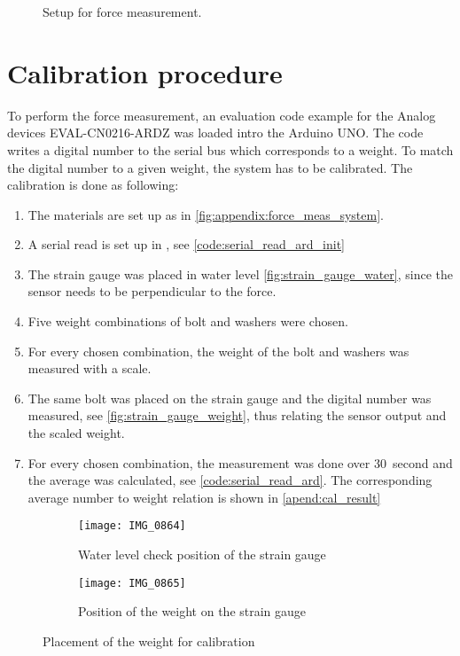 \begin{figure}[H]
\centering
\def\svgwidth{\columnwidth}

%
\caption{Setup for force measurement.}
		\label{fig:appendix:force_meas_system}
\end{figure}

\section*{Calibration procedure}
To perform the force measurement, an evaluation code example for the Analog devices EVAL-CN0216-ARDZ was loaded intro the Arduino UNO. The code writes a digital number to the serial bus which corresponds to a weight. To match the digital number to a given weight, the system has to be calibrated. The calibration is done as following: 

\begin{enumerate}
\item The materials are set up as in \autoref{fig:appendix:force_meas_system}.
\item A serial read is set up in \matlab, see \autoref{code:serial_read_ard_init}
\item The strain gauge was placed in water level \autoref{fig:strain_gauge_water}, since the sensor needs to be perpendicular to the force.
\item  Five weight combinations of bolt and washers were chosen.
\item  For every chosen combination, the weight of the bolt and washers was measured with a scale.
\item The same bolt was placed on the strain gauge and the digital number was measured, see \autoref{fig:strain_gauge_weight}, thus relating the sensor output and the scaled weight. 
\item For every chosen combination, the measurement was done over \SI{30}{second} and the average was calculated, see \autoref{code:serial_read_ard}. The corresponding average number to weight relation is shown in \autoref{apend:cal_result}
\end{enumerate}

\begin{figure}[H]
\centering
\begin{subfigure}[htbp]{0.45\textwidth}
		\texttt{[image: IMG\_0864]}
		\caption{Water level check position of the strain gauge}
		\label{fig:strain_gauge_water}
\end{subfigure}\vspace{10pt}
\begin{subfigure}[htbp]{0.45\textwidth}
		\texttt{[image: IMG\_0865]}
		\caption{Position of the weight on the strain gauge}
		\label{fig:strain_gauge_weight}
\end{subfigure} \hspace{10pt}
\caption{Placement of the weight for calibration}
\label{fig:bc_weight_meas}
\end{figure}


